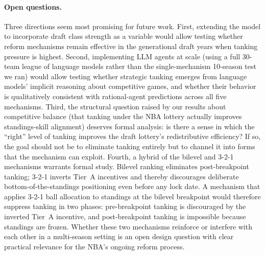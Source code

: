 \documentclass{article}
\begin{document}
\paragraph{Open questions.}
Three directions seem most promising for future work.
First, extending the model to incorporate draft class strength as a variable
would allow testing whether reform mechanisms remain effective in the
generational draft years when tanking pressure is highest.
Second, implementing LLM agents at scale (using a full 30-team league of
language models rather than the single-mechanism 10-season test we ran) would
allow testing whether strategic tanking emerges from language models' implicit
reasoning about competitive games, and whether their behavior is qualitatively
consistent with rational-agent predictions across all five mechanisms.
Third, the structural question raised by our results about competitive
balance (that tanking under the NBA lottery actually improves standings-skill
alignment) deserves formal analysis: is there a sense in which the ``right''
level of tanking improves the draft lottery's redistributive efficiency?
If so, the goal should not be to eliminate tanking entirely but to channel it
into forms that the mechanism can exploit.
Fourth, a hybrid of the bilevel and 3-2-1 mechanisms warrants formal study.
Bilevel ranking eliminates post-breakpoint tanking; 3-2-1 inverts Tier~A
incentives and thereby discourages deliberate bottom-of-the-standings
positioning even before any lock date.
A mechanism that applies 3-2-1 ball allocation to standings at the bilevel
breakpoint would therefore suppress tanking in two phases: pre-breakpoint
tanking is discouraged by the inverted Tier~A incentive, and post-breakpoint
tanking is impossible because standings are frozen.
Whether these two mechanisms reinforce or interfere with each other in a
multi-season setting is an open design question with clear practical relevance
for the NBA's ongoing reform process.

\end{document}
